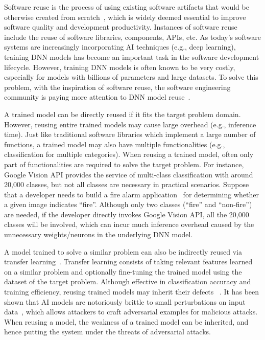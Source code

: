 Software reuse is the process of using existing software artifacts that would be otherwise created from scratch~\cite{software_reuse_1,software_reuse_2,software_reuse_3}, which is widely deemed essential to improve software quality and development productivity. 
Instances of software reuse include the reuse of software libraries, components, APIs, etc. 
As today's software systems are increasingly incorporating AI techniques (e.g., deep learning),  training DNN models has become an important task in the software development lifecycle. 
However, training DNN models is often known to be 
very costly, especially for models with billions of parameters and large datasets.
To solve this problem, with the inspiration of software reuse, the software engineering community is paying more attention to DNN model reuse~\cite{icse21discriminiate, ji2018model, modeldiff, ReMos, nnmodularity2022icse,fse2020modularity, qi2022patching}.

A trained model can be directly reused if it fits %
the {target problem} domain. %
However, reusing entire trained models may cause large %
overhead (e.g., inference time).
Just like traditional software libraries which implement a large number of functions, a trained model may also have multiple functionalities (e.g., classification for multiple categories).
When reusing a trained model, often only part of functionalities are required to solve the target problem.
For instance, Google Vision API provides the service of  multi-class classification with around 20,000 classes, but not all classes are necessary in practical scenarios. Suppose that a developer needs to build a fire alarm application~\cite{fireapp} for determining whether a given image indicates ``fire''.
Although only two classes (``fire'' and ``non-fire'') are needed, if the developer directly invokes Google Vision API, all the 20,000 classes will be involved, which can incur much inference overhead caused by the unnecessary weights/neurons in the underlying DNN model. 


A model trained to solve a similar problem can also be indirectly reused via transfer learning~\cite{transfer_nips,devlin2018bert}.
Transfer learning consists of taking relevant features learned on a similar problem and optionally fine-tuning the trained model using the dataset of the target problem. %
Although effective in classification accuracy and training efficiency, reusing trained models may inherit their defects %
~\cite{dlfuzz,deepxplore,defect3}.
It has been shown that AI models are notoriously brittle to small perturbations on input data~\cite{huang2011adversarial, deepxplore},
which allows attackers to craft adversarial examples for malicious attacks.
When reusing a model, the weakness of a trained model can be inherited, and hence putting the system under the threats of adversarial attacks.



